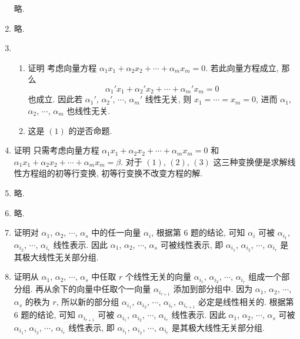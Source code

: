 \documentclass[a4paper, 11pt]{ctexart}
\begin{document}
\begin{enumerate}
            略.
        \item %
            略.
        \item %
            \begin{enumerate}[(1)]
                \item %
                    {\heiti 证明} 考虑向量方程 $\alpha_1x_1 + \alpha_2x_2 + \cdots + \alpha_mx_m = 0$. 若此向量方程成立, 那么
                    \[
                        \alpha_1'x_1 + \alpha_2'x_2 + \cdots + \alpha_m'x_m = 0    
                    \] 也成立. 因此若 $\alpha_1'$, $\alpha_2'$, $\cdots$, $\alpha_m'$ 线性无关, 则 $x_1 = \cdots = x_m = 0$,
                    进而 $\alpha_1$, $\alpha_2$, $\cdots$, $\alpha_m$ 也线性无关.
                \item %
                    这是 $(1)$ 的逆否命题.
            \end{enumerate}
        \item %
            {\heiti 证明} 只需考虑向量方程 $\alpha_1x_1 + \alpha_2x_2 + \cdots + \alpha_mx_m = 0$ 和 $\alpha_1x_1 + \alpha_2x_2 + \cdots + \alpha_mx_m = \beta$. 对于 $(1)$, $(2)$, $(3)$ 这三种变换便是求解线性方程组的初等行变换,
            初等行变换不改变方程的解.
        \item %
            略.
        \item %
            略.
        \item %
            {\heiti 证明}\quad 对 $\alpha_1$, $\alpha_2$, $\cdots$, $\alpha_s$ 中的任一向量 $\alpha_i$, 根据{\heiti 第 6 题}的结论, 可知 $\alpha_i$ 可被 $\alpha_{i_1}$, $\alpha_{i_2}$, $\cdots$, $\alpha_{i_r}$ 线性表示.
            因此 $\alpha_1$, $\alpha_2$, $\cdots$, $\alpha_s$ 可被线性表示, 即 $\alpha_{i_1}$, $\alpha_{i_2}$, $\cdots$, $\alpha_{i_r}$ 是其极大线性无关部分组.
        \item %
            {\heiti 证明}\quad 从 $\alpha_1$, $\alpha_2$, $\cdots$, $\alpha_s$ 中任取 $r$ 个线性无关的向量 $\alpha_{i_1}$, $\alpha_{i_2}$, $\cdots$, $\alpha_{i_r}$ 组成一个部分组.
            再从余下的向量中任取个一向量 $\alpha_{i_{r+1}}$ 添加到部分组中. 因为 $\alpha_1$, $\alpha_2$, $\cdots$, $\alpha_s$ 的秩为 $r$, 所以新的部分组 $\alpha_{i_1}$, $\alpha_{i_2}$, $\cdots$, $\alpha_{i_r}$, $\alpha_{i_{r+1}}$ 必定是线性相关的.
            根据{\heiti 第 6 题}的结论, 可知 $\alpha_{i_{r+1}}$ 可被 $\alpha_{i_1}$, $\alpha_{i_2}$, $\cdots$, $\alpha_{i_r}$ 线性表示.
            因此 $\alpha_1$, $\alpha_2$, $\cdots$, $\alpha_s$ 可被 $\alpha_{i_1}$, $\alpha_{i_2}$, $\cdots$, $\alpha_{i_r}$ 线性表示, 即 $\alpha_{i_1}$, $\alpha_{i_2}$, $\cdots$, $\alpha_{i_r}$ 是其极大线性无关部分组.

\end{enumerate}
\end{document}
